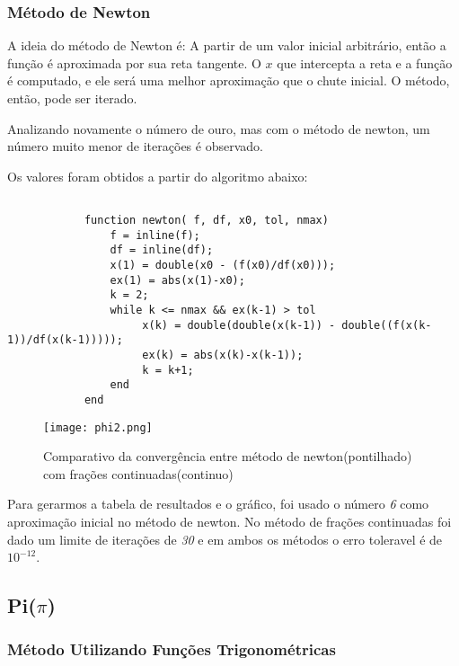 		\subsubsection{Método de Newton}

			A ideia do método de Newton é: A partir de um valor inicial
			arbitrário, então a função é aproximada por sua reta tangente. O $x$
			que intercepta a reta e a função é computado, e ele será uma melhor
			aproximação que o chute inicial. O método, então, pode ser iterado.

			Analizando novamente o número de ouro, mas com o método de newton,
			um número muito menor de iterações é observado.

			

			\newpage

			Os valores foram obtidos a partir do algoritmo abaixo:

			\begin{lstlisting}

			function newton( f, df, x0, tol, nmax)
				f = inline(f);
				df = inline(df);
				x(1) = double(x0 - (f(x0)/df(x0)));
				ex(1) = abs(x(1)-x0);
				k = 2;
				while k <= nmax && ex(k-1) > tol
					 x(k) = double(double(x(k-1)) - double((f(x(k-1))/df(x(k-1)))));
					 ex(k) = abs(x(k)-x(k-1));
					 k = k+1;
				end
			end

			\end{lstlisting}

			\begin{figure}[H]
				\centering
				\texttt{[image: phi2.png]}
				\caption{Comparativo da convergência entre método de newton(pontilhado) com frações continuadas(continuo)}
				\label{fig:phi-graphic}
			\end{figure}

			Para gerarmos a tabela de resultados e o gráfico, foi usado o número
			\emph{6} como aproximação inicial no método de newton. No método de
			frações continuadas foi dado um limite de iterações de \emph{30} e
			em ambos os métodos o erro toleravel é de $10^{-12}$.

	\subsection{Pi($\pi$)}

		\subsubsection{Método Utilizando Funções Trigonométricas}

